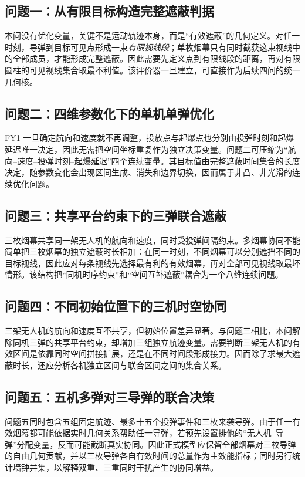 \subsection{问题一：从有限目标构造完整遮蔽判据}
本问没有优化变量，关键不是运动轨迹本身，而是“有效遮蔽”的几何定义。对任一时刻，导弹到目标可见点形成一束\emph{有限视线段}；单枚烟幕只有同时截获这束视线中的全部成员，才能形成完整遮蔽。因此需要先定义点到有限线段的距离，再对有限圆柱的可见视线集合取最不利值。该评价器一旦建立，可直接作为后续四问的统一几何核。

\subsection{问题二：四维参数化下的单机单弹优化}
FY1 一旦确定航向和速度就不再调整，投放点与起爆点也分别由投弹时刻和起爆延迟唯一决定，因此无需把空间坐标重复作为独立决策变量。问题二可压缩为“航向--速度--投弹时刻--起爆延迟”四个连续变量。其目标值由完整遮蔽时间集合的长度决定，随参数变化会出现区间生成、消失和边界切换，因而属于非凸、非光滑的连续优化问题。

\subsection{问题三：共享平台约束下的三弹联合遮蔽}
三枚烟幕共享同一架无人机的航向和速度，同时受投弹间隔约束。多烟幕协同不能简单把三枚烟幕的独立遮蔽时长相加：在同一时刻，不同烟幕可以分别遮挡不同的目标视线，因此应对每条视线先选择最有利的有效烟幕，再对全部可见视线取最坏情形。该结构把“同机时序约束”和“空间互补遮蔽”耦合为一个八维连续问题。

\subsection{问题四：不同初始位置下的三机时空协同}
三架无人机的航向和速度互不共享，但初始位置差异显著。与问题三相比，本问解除同机三弹的共享平台约束，却增加三组独立航迹变量。需要判断三架无人机的有效区间是依靠同时空间拼接扩展，还是在不同时间段形成接力。因而除了求最大遮蔽时长，还应分析各机独立区间与联合区间之间的集合关系。

\subsection{问题五：五机多弹对三导弹的联合决策}
问题五同时包含五组固定航迹、最多十五个投弹事件和三枚来袭导弹。由于任一有效烟幕都可能依据实时几何关系帮助任一导弹，若预先设置排他的“无人机--导弹”分配变量，反而可能截断真实协同。因此正式模型应保留全部烟幕对三枚导弹的自由几何贡献，并以三枚导弹各自有效时间的总量作为主效能指标；同时另行统计墙钟并集，以解释双重、三重同时干扰产生的协同增益。

